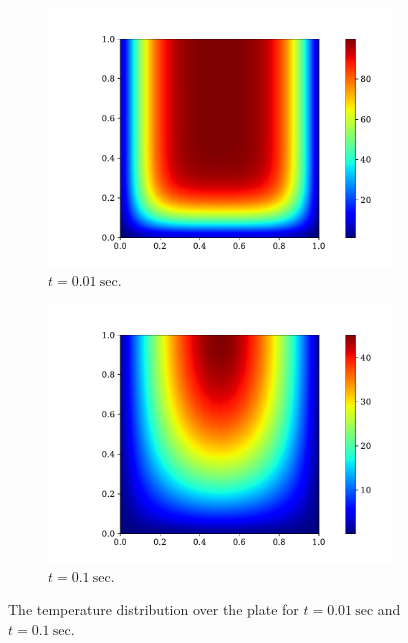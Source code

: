 \documentclass[a4paper, 11pt]{article}
\begin{document}
% 
\begin{figure}[ht!]
\centering
\begin{subfigure}{0.5\textwidth}
  \centering
  \includegraphics[width=1\linewidth]{0d01sec.pdf}
  \caption{$t = 0.01 \ \text{sec}$.}
  \label{fig:sub31}
\end{subfigure}%
\begin{subfigure}{0.5\textwidth}
  \centering
  \includegraphics[width=1\linewidth]{0d1sec.pdf}
  \caption{$t = 0.1 \ \text{sec}$.}
  \label{fig:sub2}
\end{subfigure}
\caption{The temperature distribution over the plate for $t = 0.01 \ \text{sec}$ and $t = 0.1 \ \text{sec}$.}
\label{fig:sub32}
\end{figure}
\end{document}
